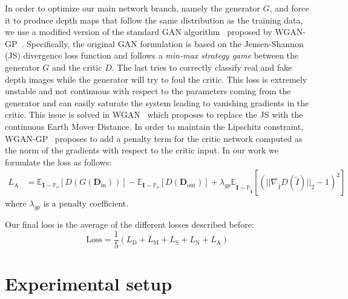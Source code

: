 \vspace{1mm}
 In order to optimize our main network branch, namely the generator $G$, and force it to produce depth maps that follow the same distribution as the training data, we use a modified version of the standard GAN algorithm~\cite{NIPS2014_5ca3e9b1} proposed by WGAN-GP~\cite{NIPS2017_892c3b1c}. Specifically, the original GAN formulation is based on the Jensen-Shannon (JS) divergence loss function and follows a \textit{min-max strategy game} between the generator $G$ and the critic $D$. The last tries to correctly classify real and fake depth images while the generator will try to foul the critic. This loss is extremely unstable and not continuous with respect to the parameters coming from the generator and can easily saturate the system leading to vanishing gradients in the critic. This issue is solved in WGAN~\cite{arjovsky2017wasserstein} which proposes to replace the JS with the continuous Earth Mover Distance. In order to maintain the Lipschitz constraint, WGAN-GP~\cite{NIPS2017_892c3b1c} proposes to add a penalty term for the critic network computed as the norm of the gradients with respect to the critic input. In our work we formulate the loss as follows:
\begin{align}
    L_\textrm{A} & = \mathbb{E}_{\textbf{I} \sim \mathbb{P}_o}[D(G(\mathbf{D}_{\textrm{in}}))] - \mathbb{E}_{\textbf{I} \sim \mathbb{P}_o}[D(\mathbf{D}_{\textrm{out}})] + \lambda_{gp} \mathbb{E}_{\tilde{\mathbf{I}} \sim \mathbb{P}_{\tilde{\mathbf{I}}}}[(|| \nabla_{\tilde{I}} D(\tilde{I}) ||_2 - 1) ^ 2]
\end{align}
where $\lambda_{gp}$ is a penalty coefficient.

\vspace{1mm}
 Our final loss is the average of the different losses described before:
\begin{equation}
     \text{Loss} =\frac{1}{5}(L_{\textrm{D}} + L_{\textrm{M}} + L_{\textrm{S}} + L_{\textrm{N}} + L_{\textrm{A}}) 
\end{equation}

\section{Experimental setup}

